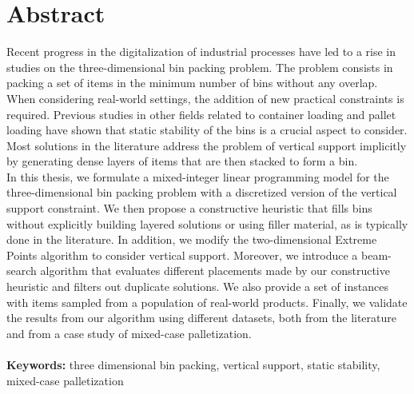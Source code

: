 
\chapter*{Abstract} 
Recent progress in the digitalization of industrial processes have led to a rise in studies on the three-dimensional bin packing problem.
The problem consists in packing a set of items in the minimum number of bins without any overlap.
When considering real-world settings, the addition of new practical constraints is required.
Previous studies in other fields related to container loading and pallet loading have shown that static stability of the bins is a crucial aspect to consider.
Most solutions in the literature address the problem of vertical support implicitly by generating dense layers of items that are then stacked to form a bin.
\\
In this thesis, we formulate a mixed-integer linear programming model for the three-dimensional bin packing problem with a discretized version of the vertical support constraint.
We then propose a constructive heuristic that fills bins without explicitly building layered solutions or using filler material, as is typically done in the literature.
In addition, we modify the two-dimensional Extreme Points algorithm to consider vertical support.
Moreover, we introduce a beam-search algorithm that evaluates different placements made by our constructive heuristic and filters out duplicate solutions.
We also provide a set of instances with items sampled from a population of real-world products.
Finally, we validate the results from our algorithm using different datasets, both from the literature and from a case study of mixed-case palletization.
\\
\\
\textbf{Keywords:} three dimensional bin packing, vertical support, static stability, mixed-case palletization